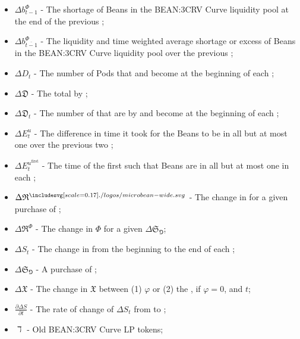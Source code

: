 \documentclass[class=article, crop=false]{standalone}
\begin{document}
\begin{itemize}[topsep=0pt, itemsep=3pt,leftmargin=16pt]
    \item[] $\Delta b_{t-1}^{\Phi}$ - \hypertarget{ht51}{The shortage of Beans in the BEAN:3CRV Curve liquidity pool at the end of the previous };
    \item[] $\Delta b_{\overline{t-1}}^{\Phi}$ - \hypertarget{ht52}{The liquidity and time weighted average shortage or excess of Beans in the BEAN:3CRV Curve liquidity pool over the previous };
    \item[] $\Delta D_t$ - \hypertarget{ht53}{The number of Pods that  and become  at the beginning of each };
    \item[] $\Delta \mathfrak{D}$ - \hypertarget{ht54}{The total   by };
    \item[] $\Delta \mathfrak{D}_t$ - \hypertarget{ht55}{The number of  that are  by  and become  at the beginning of each };
    \item[] $\Delta E_{t}^{u}$ - \hypertarget{ht56}{The difference in time it took for the Beans to be  in all but at most one  over the previous two };
    \item[] $\Delta E_{t}^{u^{\text{first}}}$ - \hypertarget{ht57}{The time of the first  such that Beans are  in all but at most one  in each };
    \item[] $\Delta \mathfrak{R}^{\bean}$ - \hypertarget{ht58}{The change in  \Bean for a given purchase of };
    \item[] $\Delta \mathfrak{R}^{\Phi}$ - \hypertarget{ht59}{The change in  $\Phi$ for a given $\Delta \mathfrak{S}_{\Game}$};
    \item[] $\Delta S_t$ - \hypertarget{ht60}{The change in  from the beginning to the end of each };
    \item[] $\Delta \mathfrak{S}_{\Game}$ - \hypertarget{ht61}{A purchase of };
    \item[] $\Delta \mathfrak{X}$ - \hypertarget{ht62}{The change in $\mathfrak{X}$ between (1) $\varphi$ or (2) the , if $\varphi = 0$, and $t$};
    \item[] $\frac{\partial \Delta S}{\partial t}$ - \hypertarget{ht63}{The rate of change of $\Delta S_t$ from  to };
    \item[] $\daleth$ - \hypertarget{ht64}{Old BEAN:3CRV Curve LP tokens};

\end{itemize}
\end{document}
